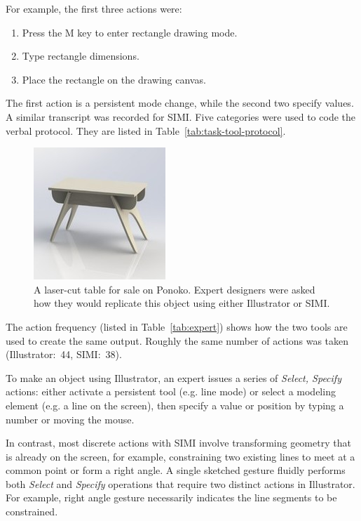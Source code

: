 \begin{samepage}
For example, the first three actions were:

\begin{enumerate}
\item Press the M key to enter rectangle drawing mode.
\item Type rectangle dimensions.
\item Place the rectangle on the drawing canvas.
\end{enumerate}
\end{samepage}

The first action is a persistent mode change, while the second two
specify values. A similar transcript was recorded for SIMI. Five
categories were used to code the verbal protocol. They are listed in
Table~\ref{tab:task-tool-protocol}.



\begin{figure}[h]
  \centering
  \includegraphics[width=0.4\linewidth]{img/table.jpg}
  \caption[Laser-cut Table Sold on Ponoko]{A laser-cut table for sale
    on Ponoko. Expert designers were asked how they would replicate
    this object using either Illustrator or SIMI.}
  \label{fig:table}
\end{figure}



The action frequency (listed in Table~\ref{tab:expert}) shows how the
two tools are used to create the same output. Roughly the same number
of actions was taken (Illustrator:~44, SIMI:~38).

To make an object using Illustrator, an expert issues a series of
\textit{Select, Specify} actions: either activate a persistent tool
(e.g. line mode) or select a modeling element (e.g. a line on the
screen), then specify a value or position by typing a number or moving
the mouse.

In contrast, most discrete actions with SIMI involve transforming
geometry that is already on the screen, for example, constraining two
existing lines to meet at a common point or form a right angle. A
single sketched gesture fluidly performs both \textit{Select} and
\textit{Specify} operations that require two distinct actions in
Illustrator. For example, right angle gesture necessarily indicates
the line segments to be constrained.

